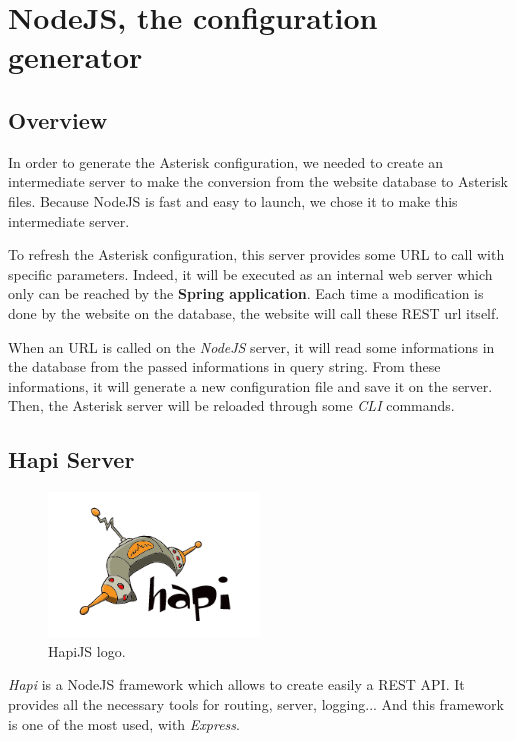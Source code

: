 \chapter{NodeJS, the configuration generator}
\section{Overview}

In order to generate the Asterisk configuration, we needed to create an intermediate server to make the conversion from the website database to Asterisk files. Because NodeJS is fast and easy to launch, we chose it to make this intermediate server. \newline

To refresh the Asterisk configuration, this server provides some URL to call with specific parameters. Indeed, it will be executed as an internal web server which only can be reached by the \textbf{Spring application}. Each time a modification is done by the website on the database, the website will call these REST url itself. \newline

When an URL is called on the \textit{NodeJS} server, it will read some informations in the database from the passed informations in query string. From these informations, it will generate a new configuration file and save it on the server. Then, the Asterisk server will be reloaded through some \textit{CLI} commands.

\section{Hapi Server}

\begin{figure}[!ht]
  \caption{HapiJS logo.}
  \centering
    \includegraphics[width=0.5\textwidth]{img/hapijs}
\end{figure}

\textit{Hapi} is a NodeJS framework which allows to create easily a REST API. It provides all the necessary tools for routing, server, logging... And this framework is one of the most used, with \textit{Express}.

